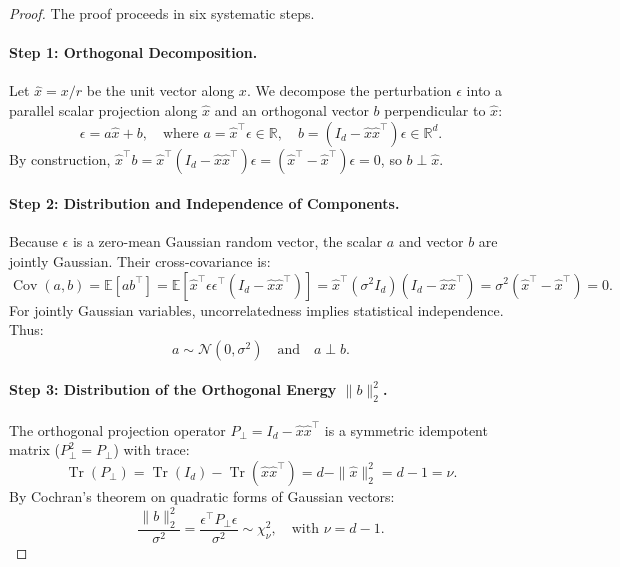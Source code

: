 \begin{proof}
The proof proceeds in six systematic steps.

\paragraph{Step 1: Orthogonal Decomposition.}
Let $\hat{x} = x / r$ be the unit vector along $x$. We decompose the perturbation $\epsilon$ into a parallel scalar projection along $\hat{x}$ and an orthogonal vector $b$ perpendicular to $\hat{x}$:
\begin{equation}
\epsilon = a \hat{x} + b, \quad \text{where } a = \hat{x}^\top \epsilon \in \mathbb{R}, \quad b = (I_d - \hat{x}\hat{x}^\top)\epsilon \in \mathbb{R}^d.
\end{equation}
By construction, $\hat{x}^\top b = \hat{x}^\top (I_d - \hat{x}\hat{x}^\top)\epsilon = (\hat{x}^\top - \hat{x}^\top)\epsilon = 0$, so $b \perp \hat{x}$.

\paragraph{Step 2: Distribution and Independence of Components.}
Because $\epsilon$ is a zero-mean Gaussian random vector, the scalar $a$ and vector $b$ are jointly Gaussian. Their cross-covariance is:
\begin{equation}
\operatorname{Cov}(a, b) = \mathbb{E}[a b^\top] = \mathbb{E}[\hat{x}^\top \epsilon \epsilon^\top (I_d - \hat{x}\hat{x}^\top)] = \hat{x}^\top (\sigma^2 I_d)(I_d - \hat{x}\hat{x}^\top) = \sigma^2 (\hat{x}^\top - \hat{x}^\top) = 0.
\end{equation}
For jointly Gaussian variables, uncorrelatedness implies statistical independence. Thus:
\begin{equation}
a \sim \mathcal{N}(0, \sigma^2) \quad \text{and} \quad a \perp b.
\end{equation}

\paragraph{Step 3: Distribution of the Orthogonal Energy $\|b\|_2^2$.}
The orthogonal projection operator $P_\perp = I_d - \hat{x}\hat{x}^\top$ is a symmetric idempotent matrix ($P_\perp^2 = P_\perp$) with trace:
\begin{equation}
\operatorname{Tr}(P_\perp) = \operatorname{Tr}(I_d) - \operatorname{Tr}(\hat{x}\hat{x}^\top) = d - \|\hat{x}\|_2^2 = d - 1 = \nu.
\end{equation}
By Cochran's theorem on quadratic forms of Gaussian vectors:
\begin{equation}
\frac{\|b\|_2^2}{\sigma^2} = \frac{\epsilon^\top P_\perp \epsilon}{\sigma^2} \sim \chi^2_\nu, \quad \text{with } \nu = d - 1.
\end{equation}


\end{proof}
